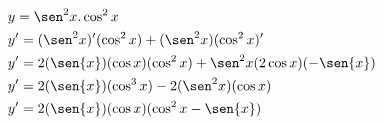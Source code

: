 \begin{ex}
\begin{align}
&y=\sen^2{x}.\cos^2{x}\nonumber\\
&y'=(\sen^2{x})'(\cos^2{x})+(\sen^2{x})(\cos^2{x})'\nonumber\\
&y'=2(\sen{x})(\cos{x})(\cos^2{x})+\sen^2{x}(2\cos{x})(-\sen{x})\nonumber\\
&y'=2(\sen{x})(\cos^3{x})-2(\sen^2{x})(\cos{x})\nonumber\\
&y'=2(\sen{x})(\cos{x})(\cos^2{x}-\sen{x})\nonumber
\end{align}
\end{ex}